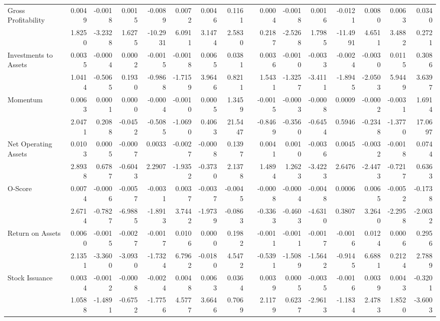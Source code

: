 \begin{table}[h]
{\begin{tabular}{lrrrrrrrrrrrrrrr}
Gross Profitability & 0.0049 & -0.0018 & 0.0015 & -0.0089 & 0.0072 & 0.0046 & 0.1161 &       & 0.0004 & -0.0018 & 0.0016 & -0.0121 & 0.0080 & 0.0063 & 0.0340 \\
& 1.8250 & -3.2328 & 1.6275 & -10.2931 & 6.0911 & 3.1474 & 2.5830 &       & 0.2187 & -2.5268 & 1.7985 & -11.4991 & 4.6511 & 3.4882 & 0.2721 \\
Investments to Assets & 0.0035 & -0.0004 & 0.0002 & -0.0015 & -0.0018 & 0.0065 & 0.0381 &       & 0.0036 & -0.0010 & -0.0033 & -0.0024 & -0.0030 & 0.0115 & 0.3086 \\
& 1.0414 & -0.5065 & 0.1930 & -0.9868 & -1.7159 & 3.9646 & 0.8211 &       & 1.5431 & -1.3257 & -3.4111 & -1.8945 & -2.0503 & 5.9449 & 3.6397 \\
Momentum & 0.0063 & 0.0001 & 0.0000 & -0.0004 & -0.0010 & 0.0005 & 1.3459 &       & -0.0015 & -0.0003 & -0.0008 & 0.0009 & -0.0002 & -0.0031 & 1.6914 \\
& 2.0471 & 0.2088 & -0.0452 & -0.5085 & -1.0690 & 0.4063 & 21.5447 &       & -0.8469 & -0.3560 & -0.6454 & 0.5946 & -0.2348 & -1.3770 & 17.0697 \\
Net Operating Assets & 0.0103 & 0.0005 & -0.0007 & 0.0033 & -0.0027 & -0.0008 & 0.1397 &       & 0.0041 & 0.0010 & -0.0036 & 0.0045 & -0.0032 & -0.0018 & 0.0744 \\
& 2.8938 & 0.6787 & -0.6043 & 2.2907 & -1.9352 & -0.3730 & 2.1378 &       & 1.4894 & 1.2623 & -3.4223 & 2.6476 & -2.4473 & -0.7217 & 0.6363 \\
O-Score & 0.0074 & -0.0006 & -0.0057 & -0.0031 & 0.0037 & -0.0037 & -0.0045 &       & -0.0008 & -0.0004 & -0.0048 & 0.0006 & 0.0065 & -0.0052 & -0.1738 \\
& 2.6714 & -0.7827 & -6.9885 & -1.8913 & 3.7442 & -1.9739 & -0.0863 &       & -0.3363 & -0.4603 & -4.6310 & 0.3807 & 3.2640 & -2.2958 & -2.0032 \\
Return on Assets & 0.0060 & -0.0015 & -0.0027 & -0.0017 & 0.0106 & 0.0000 & 0.1982 &       & -0.0011 & -0.0011 & -0.0017 & -0.0016 & 0.0124 & 0.0006 & 0.2956 \\
& 2.1351 & -3.3600 & -3.0930 & -1.7324 & 6.7962 & -0.0180 & 4.5472 &       & -0.5391 & -1.5089 & -1.5642 & -0.9145 & 6.6881 & 0.2124 & 2.7889 \\
Stock Issuance & 0.0034 & -0.0012 & -0.0008 & -0.0024 & 0.0048 & 0.0063 & 0.0364 &       & 0.0039 & 0.0005 & -0.0035 & -0.0016 & 0.0039 & 0.0043 & -0.3201 \\
& 1.0588 & -1.4891 & -0.6752 & -1.7756 & 4.5777 & 3.6646 & 0.7069 &       & 2.1179 & 0.6237 & -2.9613 & -1.1834 & 2.4783 & 1.8520 & -3.6003 \\
\bottomrule
\end{tabular}%
}
\label{tab:vol-ff6}%
\end{table}%

